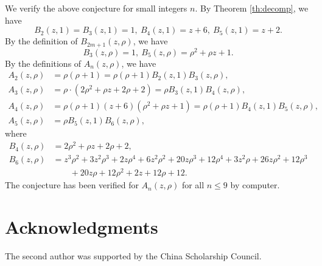 \documentclass[12pt, a4paper]{amsart} %
\numberwithin{equation}{section}
\begin{document}
We verify the above conjecture for small integers $n$. 
By Theorem \ref{th:decomp}, we have
$$
B_2(z,1)= B_3(z,1)=1, \ 
B_4(z,1)=z + 6, \ 
B_5(z,1)= z + 2.
$$
By the definition of $B_{2m+1}(z,\rho)$, we have
$$
B_3(z,\rho)=1, \ 
B_5(z,\rho)=\rho^2 + \rho z + 1.
$$
By the definitions of $A_n(z,\rho)$, we have
\begin{align*}
	A_2(z, \rho)&=\rho(\rho+1) = \rho(\rho+1) B_2(z,1) B_3(z,\rho) ,\\
	A_3(z, \rho)&=\rho \cdot (2\rho^2+\rho z+2 \rho +2) = \rho B_3(z,1) B_4(z,\rho),\\
	A_4(z,\rho) &= \rho (\rho + 1) (z + 6) (\rho^2 + \rho z + 1)   = \rho(\rho+1) B_4(z,1) B_5(z,\rho),\\
	A_5(z, \rho) &= \rho B_5(z,1) B_6(z,\rho),
\end{align*}
where 
\begin{align*}
B_4(z,\rho)&=2\rho^2+\rho z+2 \rho +2,\\
B_6(z,\rho)&= z^3 \rho^2 + 3z^2 \rho^3 + 2z\rho^4 + 6z^2 \rho^2 
	 + 20z\rho^3 + 12 \rho^4 + 3z^2 \rho + 26 z \rho^2 + 12 \rho^3 \\
	 &\qquad + 20z \rho + 12\rho^2 + 2z + 12\rho + 12.
\end{align*}
The conjecture has been verified for $A_n(z,\rho)$ for all $n \leq 9$ by computer.






\section*{Acknowledgments}
The second author was supported by the China Scholarship Council.
\end{document}
